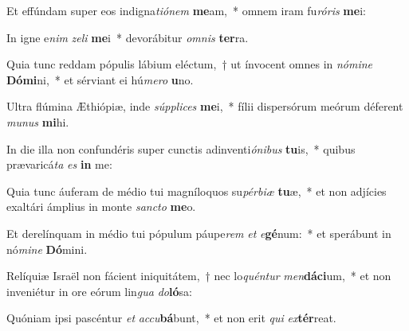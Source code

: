\item Et effúndam super eos indigna\textit{ti}\textit{ó}\textit{nem} \textbf{me}am,~* omnem iram fu\textit{ró}\textit{ris} \textbf{me}i:
\item In igne e\textit{nim} \textit{ze}\textit{li} \textbf{me}i~* devorábitur \textit{om}\textit{nis} \textbf{ter}ra.
\item Quia tunc reddam pópulis lábium eléctum,~† ut ínvocent omnes in \textit{nó}\textit{mi}\textit{ne} \textbf{Dó}\textbf{mi}ni,~* et sérviant ei hú\textit{me}\textit{ro} \textbf{u}no.
\item Ultra flúmina Æthiópiæ, inde \textit{súp}\textit{pli}\textit{ces} \textbf{me}i,~* fílii dispersórum meórum déferent \textit{mu}\textit{nus} \textbf{mi}hi.
\item In die illa non confundéris super cunctis adinventi\textit{ó}\textit{ni}\textit{bus} \textbf{tu}is,~* quibus prævaricá\textit{ta} \textit{es} \textbf{in} me:
\item Quia tunc áuferam de médio tui magníloquos su\textit{pér}\textit{bi}\textit{æ} \textbf{tu}æ,~* et non adjícies exaltári ámplius in monte \textit{sanc}\textit{to} \textbf{me}o.
\item Et derelínquam in médio tui pópulum páupe\textit{rem} \textit{et} \textit{e}\textbf{gé}num:~* et sperábunt in nó\textit{mi}\textit{ne} \textbf{Dó}mini.
\item Relíquiæ Israël non fácient iniquitátem,~† nec lo\textit{quén}\textit{tur} \textit{men}\textbf{dá}\textbf{ci}um,~* et non inveniétur in ore eórum lin\textit{gua} \textit{do}\textbf{ló}sa:
\item Quóniam ipsi pascéntur \textit{et} \textit{ac}\textit{cu}\textbf{bá}bunt,~* et non erit \textit{qui} \textit{ex}\textbf{tér}reat.
